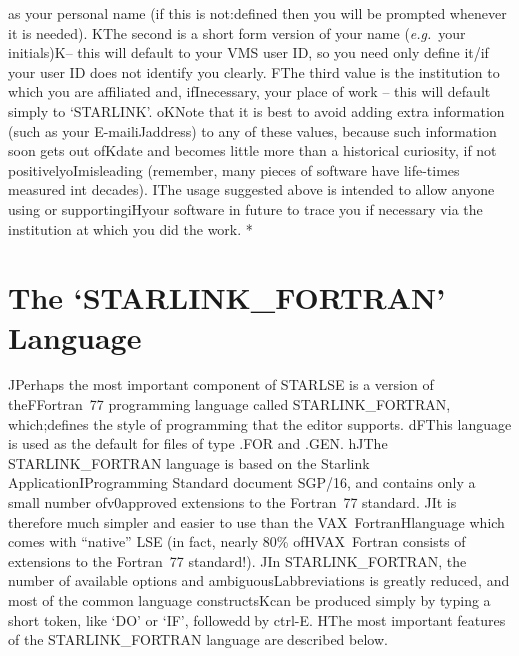 {as your personal name (if this is not: defined then you will be prompted whenever it is needed). K The second is a short form version of your name ({\em e.g.}\ your initials) K -- this will default to your \mbox{VMS} user ID, so you need only define it / if your user ID does not identify you clearly.  F The third value is the institution to which you are affiliated and, ifI necessary, your place of work -- this will default simply to `STARLINK'. o  K Note that it is best to avoid adding extra information (such as your E-mailiJ address) to any of these values, because such information soon gets out ofK date and becomes little more than a historical curiosity, if not positivelyoI misleading (remember, many pieces of software have life-times measured int
 decades). I The usage suggested above is intended to allow anyone using or supportingiH your software in future to trace you if necessary via the institution at which you did the work.   * \section{The `STARLINK\_FORTRAN' Language}  J Perhaps the most important component of \mbox{STARLSE} is a version of theF Fortran~77 programming language called \mbox{STARLINK\_FORTRAN}, which; defines the style of programming that the editor supports. dF This language is used as the default for files of type \mbox{.FOR} and
 \mbox{.GEN}. h  J The \mbox{STARLINK\_FORTRAN} language is based on the Starlink ApplicationI Programming Standard document SGP/16, and contains only a small number ofv0 approved extensions to the Fortran~77 standard. J It is therefore much simpler and easier to use than the \mbox{VAX}~FortranH language which comes with ``native'' \mbox{LSE} (in fact, nearly 80\% ofH \mbox{VAX}~Fortran consists of extensions to the Fortran~77 standard!). J In \mbox{STARLINK\_FORTRAN}, the number of available options and ambiguousL abbreviations is greatly reduced, and most of the common language constructsK can be produced simply by typing a short token, like `DO' or `IF', followedd by \mbox{ctrl-E}.   H The most important features of the \mbox{STARLINK\_FORTRAN} language are described below.    %
}
